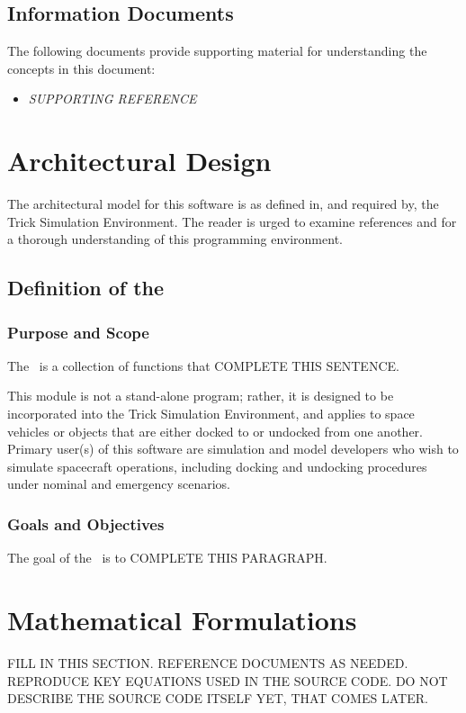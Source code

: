 \documentclass[twoside,11pt,titlepage]{report}
\begin{document}
\section{Information Documents}
The following documents provide supporting material for understanding the
concepts in this document:

\begin{itemize}
\item{\em SUPPORTING REFERENCE} \cite{SUPPORTINGREFERENCE}
\end{itemize}

\chapter{Architectural Design}\label{sec:architectural_design}
The architectural model for this software is as defined in, and
required by, the Trick Simulation Environment. The reader is urged
to examine references \cite{Vetter:TrickUTM} and \cite{Vetter:TrickVD}
for a thorough understanding of this programming environment.

\section{Definition of the \MODEL}

\subsection{Purpose and Scope}
The \MODEL\ is a collection of functions that COMPLETE THIS SENTENCE.

This module is not a stand-alone program;
rather, it is designed to be incorporated into the Trick
Simulation Environment, and applies to space vehicles or objects that are
either docked to or undocked from one another.
Primary user(s) of this software are simulation and model developers
who wish to simulate spacecraft operations, including docking and
undocking procedures under nominal and emergency scenarios.

\subsection{Goals and Objectives}
The goal of the \MODEL\ is to COMPLETE THIS PARAGRAPH.


\chapter{Mathematical Formulations}\label{sec:math_formulations}
FILL IN THIS SECTION.
REFERENCE DOCUMENTS AS NEEDED.
REPRODUCE KEY EQUATIONS USED IN THE SOURCE CODE.
DO NOT DESCRIBE THE SOURCE CODE ITSELF YET, THAT COMES LATER.
\end{document}
